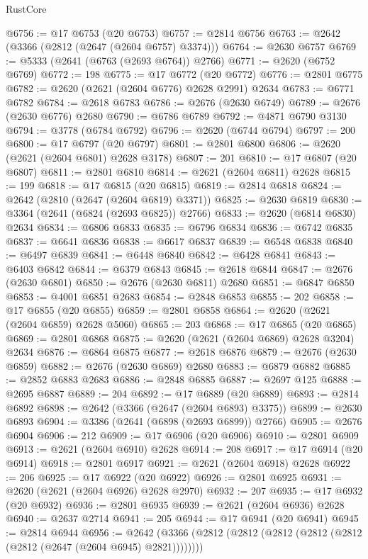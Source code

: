 \begin{lexlean}{RustCore}
\begin{coremodule}
@6756 := @17 @6753 (@20 @6753)
@6757 := @2814 @6756
@6763 := @2642 (@3366 (@2812 (@2647 (@2604 @6757) @3374)))
@6764 := @2630 @6757
@6769 := @5333 (@2641 (@6763 (@2693 @6764)) @2766)
@6771 := @2620 (@6752 @6769)
@6772 := 198
@6775 := @17 @6772 (@20 @6772)
@6776 := @2801 @6775
@6782 := @2620 (@2621 (@2604 @6776) @2628 @2991) @2634
@6783 := @6771 @6782
@6784 := @2618 @6783
@6786 := @2676 (@2630 @6749)
@6789 := @2676 (@2630 @6776) @2680
@6790 := @6786 @6789
@6792 := @4871 @6790 @3130
@6794 := @3778 (@6784 @6792)
@6796 := @2620 (@6744 @6794)
@6797 := 200
@6800 := @17 @6797 (@20 @6797)
@6801 := @2801 @6800
@6806 := @2620 (@2621 (@2604 @6801) @2628 @3178)
@6807 := 201
@6810 := @17 @6807 (@20 @6807)
@6811 := @2801 @6810
@6814 := @2621 (@2604 @6811) @2628
@6815 := 199
@6818 := @17 @6815 (@20 @6815)
@6819 := @2814 @6818
@6824 := @2642 (@2810 (@2647 (@2604 @6819) @3371))
@6825 := @2630 @6819
@6830 := @3364 (@2641 (@6824 (@2693 @6825)) @2766)
@6833 := @2620 (@6814 @6830) @2634
@6834 := @6806 @6833
@6835 := @6796 @6834
@6836 := @6742 @6835
@6837 := @6641 @6836
@6838 := @6617 @6837
@6839 := @6548 @6838
@6840 := @6497 @6839
@6841 := @6448 @6840
@6842 := @6428 @6841
@6843 := @6403 @6842
@6844 := @6379 @6843
@6845 := @2618 @6844
@6847 := @2676 (@2630 @6801)
@6850 := @2676 (@2630 @6811) @2680
@6851 := @6847 @6850
@6853 := @4001 @6851 @2683
@6854 := @2848 @6853
@6855 := 202
@6858 := @17 @6855 (@20 @6855)
@6859 := @2801 @6858
@6864 := @2620 (@2621 (@2604 @6859) @2628 @5060)
@6865 := 203
@6868 := @17 @6865 (@20 @6865)
@6869 := @2801 @6868
@6875 := @2620 (@2621 (@2604 @6869) @2628 @3204) @2634
@6876 := @6864 @6875
@6877 := @2618 @6876
@6879 := @2676 (@2630 @6859)
@6882 := @2676 (@2630 @6869) @2680
@6883 := @6879 @6882
@6885 := @2852 @6883 @2683
@6886 := @2848 @6885
@6887 := @2697 @125
@6888 := @2695 @6887
@6889 := 204
@6892 := @17 @6889 (@20 @6889)
@6893 := @2814 @6892
@6898 := @2642 (@3366 (@2647 (@2604 @6893) @3375))
@6899 := @2630 @6893
@6904 := @3386 (@2641 (@6898 (@2693 @6899)) @2766)
@6905 := @2676 @6904
@6906 := 212
@6909 := @17 @6906 (@20 @6906)
@6910 := @2801 @6909
@6913 := @2621 (@2604 @6910) @2628
@6914 := 208
@6917 := @17 @6914 (@20 @6914)
@6918 := @2801 @6917
@6921 := @2621 (@2604 @6918) @2628
@6922 := 206
@6925 := @17 @6922 (@20 @6922)
@6926 := @2801 @6925
@6931 := @2620 (@2621 (@2604 @6926) @2628 @2970)
@6932 := 207
@6935 := @17 @6932 (@20 @6932)
@6936 := @2801 @6935
@6939 := @2621 (@2604 @6936) @2628
@6940 := @2637 @2714
@6941 := 205
@6944 := @17 @6941 (@20 @6941)
@6945 := @2814 @6944
@6956 := @2642 (@3366 (@2812 (@2812 (@2812 (@2812 (@2812 (@2812 (@2647 (@2604 @6945) @2821))))))))

\end{coremodule}
\end{lexlean}

